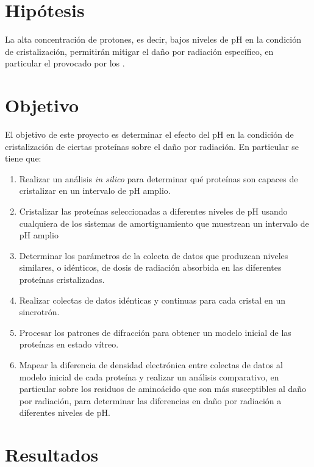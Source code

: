 \documentclass[11pt,letterpaper]{article}
\begin{document}
\section{Hipótesis}
La alta concentración de protones, es decir, bajos niveles de pH en la condición de cristalización, permitirán mitigar el daño por radiación específico, en particular el provocado por los .
	
\section{Objetivo}
El objetivo de este proyecto es determinar el efecto del pH en la condición de cristalización de ciertas proteínas sobre el daño por radiación. En particular se tiene que:

\begin{enumerate}
\item Realizar un análisis \emph{in silico} para determinar qué proteínas son capaces de cristalizar en un intervalo de pH amplio.
\item Cristalizar las proteínas seleccionadas a diferentes niveles de pH usando cualquiera de los sistemas de amortiguamiento que muestrean un intervalo de pH amplio
\item Determinar los parámetros de la colecta de datos que produzcan niveles similares, o idénticos, de dosis de radiación absorbida en las diferentes proteínas cristalizadas.
\item Realizar colectas de datos idénticas y continuas para cada cristal en un sincrotrón.
\item Procesar los patrones de difracción para obtener un modelo inicial de las proteínas en estado vítreo.
\item Mapear la diferencia de densidad electrónica entre colectas de datos al modelo inicial de cada proteína y realizar un análisis comparativo, en particular sobre los residuos de aminoácido que son más susceptibles al daño por radiación, para determinar las diferencias en daño por radiación a diferentes niveles de pH.
\end{enumerate}	
	
\section{Resultados}
\end{document}
